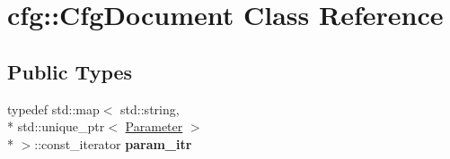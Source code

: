 \hypertarget{classcfg_1_1CfgDocument}{\section{cfg\-:\-:Cfg\-Document Class Reference}
\label{classcfg_1_1CfgDocument}
}
\subsection*{Public Types}
\begin{DoxyCompactItemize}
\item 
\hypertarget{classcfg_1_1CfgDocument_ab40d2ad0600280de539ad7022ced6a95}{typedef std\-::map$<$ std\-::string, \\*
std\-::unique\-\_\-ptr$<$ \hyperlink{classcfg_1_1Parameter}{Parameter} $>$\\*
 $>$\-::const\-\_\-iterator {\bfseries param\-\_\-itr}}\label{classcfg_1_1CfgDocument_ab40d2ad0600280de539ad7022ced6a95}

\end{DoxyCompactItemize}
